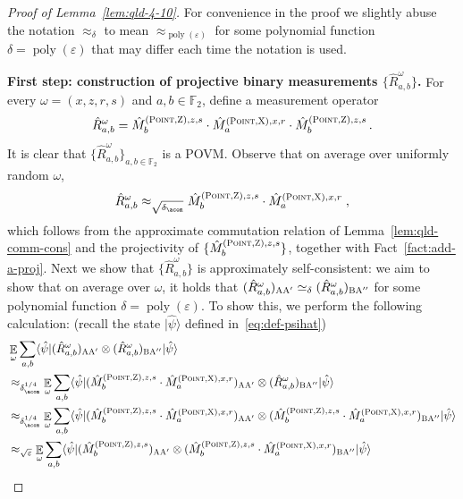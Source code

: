 \documentclass[11pt]{article}
\theoremstyle{definition}
\newcommand{\ket}[1]{|#1\rangle}
\newcommand{\bra}[1]{\langle#1|}
\newcommand{\F}{\ensuremath{\mathbb{F}}}
\DeclareMathOperator{\poly}{poly}
\newcommand{\eps}{\varepsilon}
\newcommand{\E}{\mathop{\mathbb{E}}\displaylimits}
\newcommand{\labelstyle}[1]{\ensuremath{\textsc{#1}}\xspace}
\newcommand{\xpt}{\labelstyle{X}}
\newcommand{\zpt}{\labelstyle{Z}}
\newcommand{\alice}{\labelstyle{A}}
\newcommand{\bob}{\labelstyle{B}}
\newcommand{\typestyle}[1]{\ensuremath{\textsc{#1}}\xspace}
\newcommand{\Point}{\typestyle{Point}}
\begin{document}
\begin{proof}[Proof of Lemma~\ref{lem:qld-4-10}]
For convenience in the proof we slightly abuse the notation $\approx_\delta$ to mean $\approx_{\poly(\eps)}$ for some polynomial function $\delta=\poly(\eps)$ that may differ each time the notation is used. 

\textbf{First step: construction of projective binary measurements $\{ \hat{R}^\omega_{a,b} \}$.}
	For every $\omega = (x,z,r,s)$ and $a,b \in \F_2$, define a measurement operator
	\[
		\hat{R}^\omega_{a,b} = \hat{M}^{(\Point,\zpt),z,s}_{b} \cdot \hat{M}^{(\Point,\xpt),x,r}_{a} \cdot \hat{M}^{(\Point,\zpt),z,s}_{b} \,.
	\]
	It is clear that $\{ \hat{R}^\omega_{a,b} \}_{a,b\in\F_2}$ is a POVM. Observe that on average over uniformly random $\omega$, 
	\begin{align}
	\label{eq:qld-r-2}
	\hat{R}^\omega_{a,b} \approx_{\sqrt{\delta_{\acom}}} \hat{M}^{(\Point,\zpt),z,s}_{b} \cdot \hat{M}^{(\Point,\xpt),x,r}_{a}\;,
	\end{align}
	which follows from the approximate commutation relation of Lemma~\ref{lem:qld-comm-cons} and the projectivity of $\{ \hat{M}^{(\Point,\zpt),z,s}_{b} \}$, together with Fact~\ref{fact:add-a-proj}. Next we show that $\{ \hat{R}^\omega_{a,b} \}$ is approximately self-consistent:  we aim to show that on average over $\omega$, it holds that $(\hat{R}^\omega_{a,b})_{\alice \alice'} \simeq_\delta (\hat{R}^\omega_{a,b})_{\bob \alice''}$ for some polynomial function $\delta = \poly(\eps)$. To show this, we perform the following calculation: (recall the state $\ket{\hat{\psi}}$ defined in~\eqref{eq:def-psihat})
	\begin{align}
		&\E_\omega \sum_{a,b} \bra{\hat{\psi}} (\hat{R}^\omega_{a,b})_{\alice \alice'} \otimes (\hat{R}^\omega_{a,b})_{\bob \alice''} \ket{\hat{\psi}} \notag \\
		&\approx_{\delta_{\acom}^{1/4}} \E_\omega \sum_{a,b} \bra{\hat{\psi}} (\hat{M}^{(\Point,\zpt),z,s}_{b} \cdot \hat{M}^{(\Point,\xpt),x,r}_{a})_{\alice \alice'} \otimes (\hat{R}^\omega_{a,b})_{\bob \alice''} \ket{\hat{\psi}} \label{eq:qld-rw-self-cons-1} \\
		&\approx_{\delta_{\acom}^{1/4}} \E_\omega \sum_{a,b} \bra{\hat{\psi}} (\hat{M}^{(\Point,\zpt),z,s}_{b} \cdot \hat{M}^{(\Point,\xpt),x,r}_{a})_{\alice \alice'} \otimes (\hat{M}^{(\Point,\zpt),z,s}_{b} \cdot \hat{M}^{(\Point,\xpt),x,r}_{a})_{\bob \alice''} \ket{\hat{\psi}} \label{eq:qld-rw-self-cons-2} \\		
		&\approx_{\sqrt{\eps}} \E_\omega \sum_{a,b} \bra{\hat{\psi}} (\hat{M}^{(\Point,\zpt),z,s}_{b})_{\alice \alice'} \otimes (\hat{M}^{(\Point,\zpt),z,s}_{b} \cdot \hat{M}^{(\Point,\xpt),x,r}_{a})_{\bob \alice''} \ket{\hat{\psi}} \label{eq:qld-rw-self-cons-3} \\

\end{align}
\end{proof}
\end{document}
